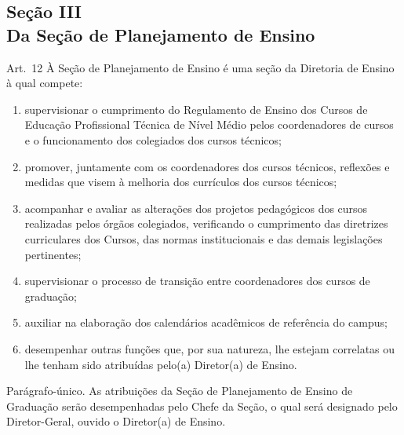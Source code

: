\documentclass[a4paper,12pt]{report}
\begin{document}
\subsection{Seção III \\ Da Seção de Planejamento de Ensino}

Art.~12 À Seção de Planejamento de Ensino é uma seção da Diretoria de Ensino à qual compete:

\begin{enumerate}
\renewcommand{\labelenumi}{\Roman{enumi}}

\item supervisionar o cumprimento do Regulamento de Ensino dos Cursos de Educação 
      Profissional Técnica de Nível Médio pelos coordenadores de cursos e o funcionamento dos colegiados dos cursos técnicos;

\item promover, juntamente com os coordenadores dos cursos técnicos, reflexões e medidas
      que visem à melhoria dos currículos dos cursos técnicos;
      
\item acompanhar e avaliar as alterações dos projetos pedagógicos dos cursos realizadas 
      pelos órgãos colegiados, verificando o cumprimento das diretrizes curriculares dos Cursos, das normas institucionais e das demais 
      legislações pertinentes;
        
\item supervisionar o processo de transição entre coordenadores dos cursos de graduação;

\item auxiliar na elaboração dos calendários acadêmicos de referência do campus;

\item desempenhar outras funções que, por sua natureza, lhe estejam correlatas ou lhe 
      tenham sido atribuídas pelo(a) Diretor(a) de Ensino.
\end{enumerate}

Parágrafo-único. As atribuições da Seção de Planejamento de Ensino de Graduação serão desempenhadas pelo Chefe da Seção, o qual será designado pelo Diretor-Geral, ouvido o Diretor(a) de Ensino.

\end{document}

